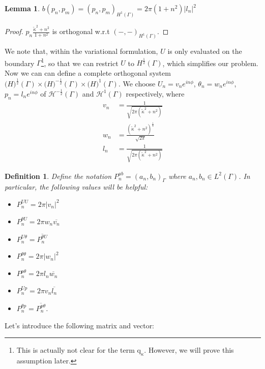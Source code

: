 \documentclass[10pt,journal,compsoc, onecolumn]{IEEEtran}
\newtheorem{lemma}[theorem]{Lemma}
\newtheorem{definition}[theorem]{Definition}
\begin{document}
\begin{lemma}
    $b(p_n, p_m) =  (p_n, p_m)_{H^1(\Gamma)} = 2 \pi(1 + n^2)|l_n|^2$
\end{lemma}
\begin{proof}
    $p_n\frac{\tilde \kappa^2 + n^2}{1 + n^2}$ is orthogonal w.r.t $(-, -)_{H^1(\Gamma)}$.
\end{proof}
We note that, within the variational formulation, $U$ is only evaluated on the boundary $\Gamma$\footnote{This is actually not clear for the term $\mathrm{q}_{\kappa}$. However, we will prove this assumption later.}, 
so that we can restrict $U$ to $H^{\frac{1}{2}}(\Gamma)$, which simplifies our problem. \\
Now we can can define a complete orthogonal system $\mathcal(H)^{\frac{1}{2}}(\Gamma) \times \mathcal(H)^{-\frac{1}{2}}(\Gamma) \times \mathcal(H)^{1}(\Gamma)$. 
We choose $U_{n}=v_{n} e^{in\phi}$, $\theta_{n}=w_{n} e^{i n \phi}$, $p_{n}=l_{n} e^{i n \phi}$ 
of \(\mathcal{H}^{-\frac{1}{2}}(\Gamma)\) and \(\mathcal{H}^{1}(\Gamma)\) respectively, where
\begin{align} 
    v_{n}&=\frac{1}{\sqrt{2 \pi\left(\tilde \kappa^2+n^{2}\right)}} \nonumber \\
    w_{n}&=\frac{\left(\tilde \kappa^2+n^{2}\right)^{\frac{1}{4}}}{\sqrt{2 \pi}} \label{eq:coefficients}\\
    l_{n}&=\frac{1}{\sqrt{2 \pi\left(\tilde \kappa^2+n^{2}\right)}} \nonumber
\end{align}
\begin{definition}
    Define the notation $P^{ab}_n = (a_n, b_n)_\Gamma$ where $a_n, b_n \in L^2(\Gamma)$. 
    In particular, the following values will be helpful: 
    \begin{itemize}
        \item $P^{UU}_n = 2\pi | v_n|^2$
        \item $P^{\theta U}_n = 2\pi w_n \overline{ v_n}$
        \item $P^{U\theta}_n = \overline{P^{\theta U}_n}$
        \item $P^{\theta \theta}_n = 2 \pi |w_n|^2$
        \item $P^{p \theta}_n = 2\pi l_n\overline{w_n}$
        \item $P^{Up}_n = 2\pi  v_n \overline{l_n}$
        \item $P^{\theta p}_n = \overline{P^{p\theta}_n }$.
    \end{itemize}
\end{definition}
Let's introduce the following matrix and vector: 
\end{document}
